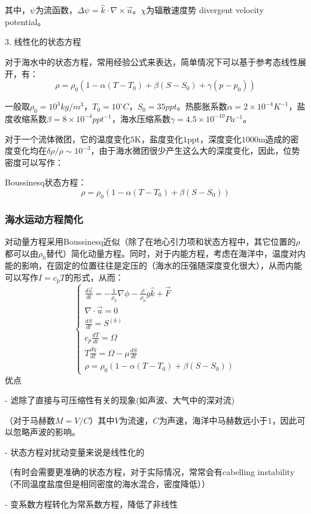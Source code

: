 \documentclass{article}
\begin{document}
其中，$\psi$为流函数，$\Delta \psi = \hat{k}\cdot\nabla\times\vec{u}$。$\chi$为辐散速度势 divergent velocity potential。

3. 线性化的状态方程

对于海水中的状态方程，常用经验公式来表达，简单情况下可以基于参考态线性展开，有：
$$\rho = \rho_0\left(1 - \alpha(T-T_0) + \beta(S-S_0) + \gamma(p-p_0)\right)$$

一般取$\rho_0=10^3 kg/m^3$，$T_0=10^{\circ}C$，$S_0 = 35ppt$。热膨胀系数$\alpha=2\times10^{-4}K^{-1}$，盐度收缩系数$\beta = 8\times10^{-4}ppt^{-1}$，海水压缩系数$\gamma = 4.5\times10^{-10} Pa^{-1}$。

对于一个流体微团，它的温度变化$5\text{K}$，盐度变化$1\text{ppt}$，深度变化$1000\text{m}$造成的密度变化均在$\delta\rho/\rho\sim 10^{-3}$，由于海水微团很少产生这么大的深度变化，因此，位势密度可以写作：

Boussinesq状态方程：
$$\rho = \rho_0(1-\alpha(T-T_0) + \beta(S-S_0))$$


\subsubsection{海水运动方程简化}
对动量方程采用Boussinesq近似（除了在地心引力项和状态方程中，其它位置的$\rho$都可以由$\rho_0$替代）简化动量方程。同时，对于内能方程，考虑在海洋中，温度对内能的影响，在固定的位置往往是定压的（海水的压强随深度变化很大），从而内能可以写作$I=c_pT$的形式，从而：
$$\begin{cases}
    \frac{d\vec{u}}{dt} = -\frac{1}{\rho_0}\nabla\phi-\frac{\rho}{\rho_0}g\hat{k}+\vec{F}\\
    \nabla\cdot\vec{u} = 0\\
    \frac{dS}{dt} = S^{(k)}\\
    c_p\frac{dT}{dt} = \Omega\\
    T\frac{d\eta}{dt} = \Omega -\mu\frac{dS}{dt}\\
    \rho = \rho_0(1-\alpha(T-T_0) + \beta(S-S_0))
\end{cases}$$
优点

- 滤除了直接与可压缩性有关的现象(如声波、大气中的深对流)

（对于马赫数$M=V/C$）其中$V$为流速，$C$为声速，海洋中马赫数远小于$1$，因此可以忽略声波的影响。

- 状态方程对扰动变量来说是线性化的

（有时会需要更准确的状态方程，对于实际情况，常常会有cabelling instability（不同温度盐度但是相同密度的海水混合，密度降低））

- 变系数方程转化为常系数方程，降低了非线性
\end{document}
